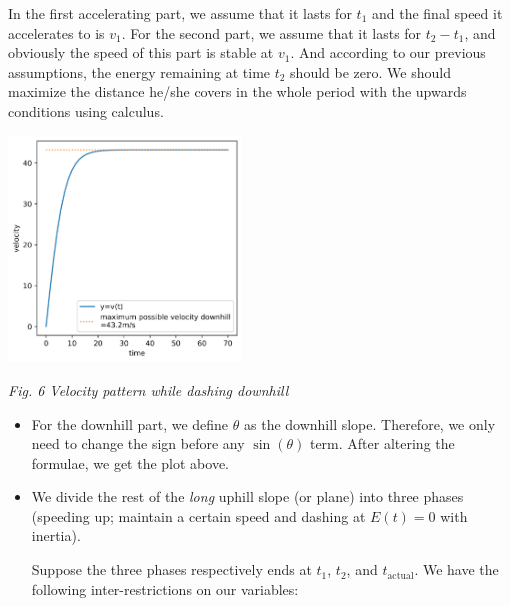 \documentclass{article}
\begin{document}
\begin{itemize}
					In the first accelerating part, we assume that it lasts for $t_1$ and the final speed it accelerates to is $v_1$. For the second part, we assume that it lasts for $t_2-t_1$, and obviously the speed of this part is stable at $v_1$. And according to our previous assumptions, the energy remaining at time $t_2$ should be zero. We should maximize the distance he/she covers in the whole period with the upwards conditions using calculus.
					\begin{center}
						\includegraphics[height = 6cm]{9.png}

						\small \textit{Fig. 6 Velocity pattern while dashing downhill}
					\end{center}

					\begin{itemize}
						\item For the downhill part, we define \(\theta\) as the downhill slope. Therefore, we only need to change the sign before any \(\sin\left(\theta\right)\) term. After altering the formulae, we get the plot above.
						\item We divide the rest of the \textit{long} uphill slope (or plane) into three phases (speeding up; maintain a certain speed and dashing at \(E(t)=0\) with inertia).

							Suppose the three phases respectively ends at \(t_1\), \(t_2\), and \(t_{\mathrm{actual}}\). We have the following inter-restrictions on our variables:


\end{itemize}
\end{itemize}
\end{document}
